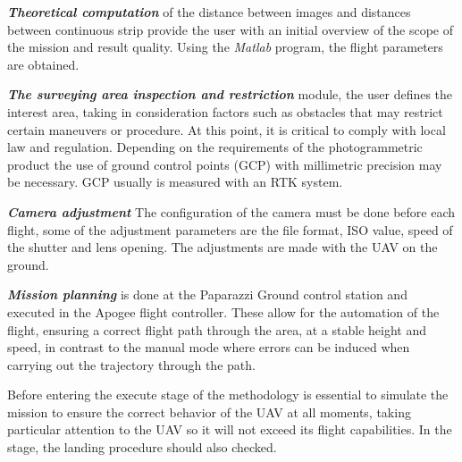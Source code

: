 \textit{\textbf{Theoretical computation}} of the distance between images and distances between continuous strip provide the user with an initial overview of the scope of the mission and result quality. Using the \textit{Matlab} program, the flight parameters are obtained.

\textit{\textbf{The surveying area inspection and restriction}} module, the user defines the interest area, taking in consideration factors such as obstacles that may restrict certain maneuvers or procedure. At this point, it is critical to comply with local law and regulation. Depending on the requirements of the photogrammetric product the use of ground control points (GCP) with millimetric precision may be necessary. GCP usually is measured with an RTK system.

\textit{\textbf{Camera adjustment}}\newline
The configuration of the camera must be done before each flight, some of the adjustment parameters are the file format, ISO value, speed of the shutter and lens opening. The adjustments are made with the UAV on the ground.

\textit{\textbf{Mission planning}} is done at the Paparazzi Ground control station and executed in the Apogee flight controller. These allow for the automation of the flight, ensuring a correct flight path through the area, at a stable height and speed, in contrast to the manual mode where errors can be induced when carrying out the trajectory through the path. 

Before entering the execute stage of the methodology is essential to simulate the mission to ensure the correct behavior of the UAV at all moments, taking particular attention to the UAV so it will not exceed its flight capabilities. In the stage, the landing procedure should also checked.
